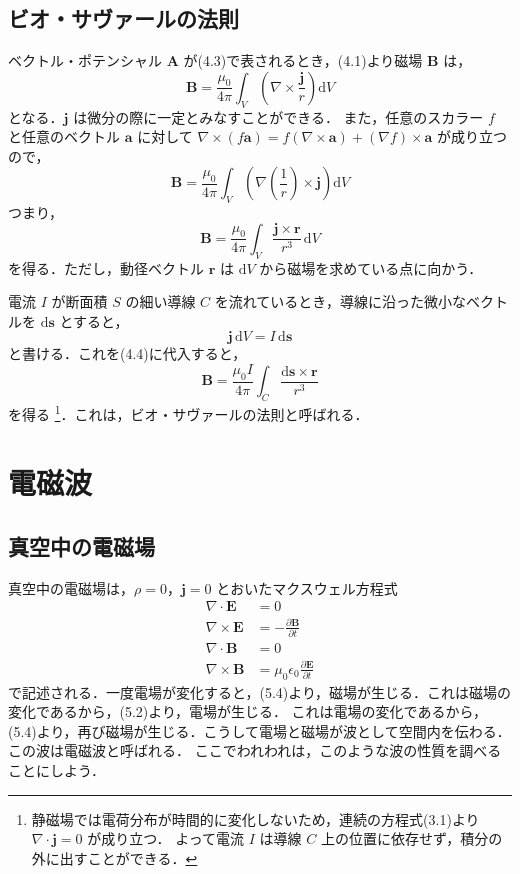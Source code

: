 \documentclass[11pt, a4paper]{ltjsarticle}
\numberwithin{equation}{section}
\begin{document}
\subsection{ビオ・サヴァールの法則}
ベクトル・ポテンシャル $\bm{A}$ が(4.3)で表されるとき，(4.1)より磁場 $\bm{B}$ は，
\[
  \bm{B} = \frac{\mu_0}{4 \pi} \int_V \left( \nabla \times \frac{\bm{j}}{r} \right) \mathrm{d}{V}
\]
となる．$\bm{j}$ は微分の際に一定とみなすことができる．
また，任意のスカラー $f$ と任意のベクトル $\bm{a}$ に対して $\nabla \times \left( f\bm{a} \right) = f \left( \nabla \times \bm{a} \right) + \left( \nabla f \right) \times \bm{a}$ が成り立つので，
\[
  \bm{B} = \frac{\mu_0}{4 \pi} \int_V \left( \nabla \left( \frac{1}{r} \right) \times \bm{j} \right) \mathrm{d}{V}
\]
つまり，
\begin{equation}
  \bm{B} = \frac{\mu_0}{4 \pi} \int_V \frac{\bm{j} \times \bm{r}}{r^{3}} \, \mathrm{d}{V}
\end{equation}
を得る．ただし，動径ベクトル $\bm{r}$ は $\mathrm{d}V$ から磁場を求めている点に向かう．

電流 $I$ が断面積 $S$ の細い導線 $C$ を流れているとき，導線に沿った微小なベクトルを $\mathrm{d}\bm{s}$ とすると，
\[
  \bm{j} \, \mathrm{d}V = I \, \mathrm{d}\bm{s}
\]
と書ける．これを(4.4)に代入すると，
\begin{equation}
  \bm{B} = \frac{\mu_0 I}{4 \pi} \int_C \frac{\mathrm{d}\bm{s} \times \bm{r}}{r^{3}}
\end{equation}
を得る
\footnote{静磁場では電荷分布が時間的に変化しないため，連続の方程式(3.1)より $\nabla \cdot \bm{j} = 0$ が成り立つ．
よって電流 $I$ は導線 $C$ 上の位置に依存せず，積分の外に出すことができる．}．これは，ビオ・サヴァールの法則と呼ばれる．

\section{電磁波}
\subsection{真空中の電磁場}
真空中の電磁場は，$\rho = 0$，$\bm{j} = 0$ とおいたマクスウェル方程式
\begin{align}
  \nabla \cdot \bm{E} &= 0 \\
  \nabla \times \bm{E} &= - \frac{\partial \bm{B}}{\partial t} \\
  \nabla \cdot \bm{B} &= 0 \\
  \nabla \times \bm{B} &= \mu_0 \epsilon_0 \frac{\partial \bm{E}}{\partial t} 
\end{align}
で記述される．一度電場が変化すると，(5.4)より，磁場が生じる．これは磁場の変化であるから，(5.2)より，電場が生じる．
これは電場の変化であるから，(5.4)より，再び磁場が生じる．こうして電場と磁場が波として空間内を伝わる．この波は電磁波と呼ばれる．
ここでわれわれは，このような波の性質を調べることにしよう．
\end{document}
